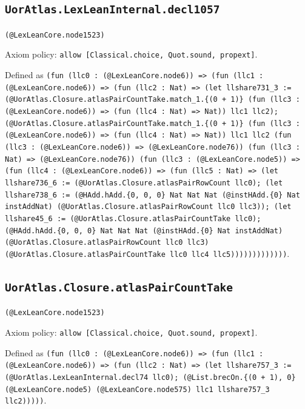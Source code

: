 \documentclass[11pt]{article}
\begin{document}
\subsection*{\texttt{UorAtlas.LexLeanInternal.decl1057}}
\noindent\texttt{(@LexLeanCore.node1523)}\par
\noindent Axiom policy: \texttt{allow [Classical.choice, Quot.sound, propext]}.\par
\noindent Defined as \texttt{(fun (llc0 : (@LexLeanCore.node6)) => (fun (llc1 : (@LexLeanCore.node6)) => (fun (llc2 : Nat) => (let llshare731\_3 := (@UorAtlas.Closure.atlasPairCountTake.match\_1.\{(0 + 1)\} (fun (llc3 : (@LexLeanCore.node6)) => (fun (llc4 : Nat) => Nat)) llc1 llc2); (@UorAtlas.Closure.atlasPairCountTake.match\_1.\{(0 + 1)\} (fun (llc3 : (@LexLeanCore.node6)) => (fun (llc4 : Nat) => Nat)) llc1 llc2 (fun (llc3 : (@LexLeanCore.node6)) => (@LexLeanCore.node76)) (fun (llc3 : Nat) => (@LexLeanCore.node76)) (fun (llc3 : (@LexLeanCore.node5)) => (fun (llc4 : (@LexLeanCore.node6)) => (fun (llc5 : Nat) => (let llshare736\_6 := (@UorAtlas.Closure.atlasPairRowCount llc0); (let llshare738\_6 := (@HAdd.hAdd.\{0, 0, 0\} Nat Nat Nat (@instHAdd.\{0\} Nat instAddNat) (@UorAtlas.Closure.atlasPairRowCount llc0 llc3)); (let llshare45\_6 := (@UorAtlas.Closure.atlasPairCountTake llc0); (@HAdd.hAdd.\{0, 0, 0\} Nat Nat Nat (@instHAdd.\{0\} Nat instAddNat) (@UorAtlas.Closure.atlasPairRowCount llc0 llc3) (@UorAtlas.Closure.atlasPairCountTake llc0 llc4 llc5)))))))))))))}.\par
\subsection*{\texttt{UorAtlas.Closure.atlasPairCountTake}}
\noindent\texttt{(@LexLeanCore.node1523)}\par
\noindent Axiom policy: \texttt{allow [Classical.choice, Quot.sound, propext]}.\par
\noindent Defined as \texttt{(fun (llc0 : (@LexLeanCore.node6)) => (fun (llc1 : (@LexLeanCore.node6)) => (fun (llc2 : Nat) => (let llshare757\_3 := (@UorAtlas.LexLeanInternal.decl74 llc0); (@List.brecOn.\{(0 + 1), 0\} (@LexLeanCore.node5) (@LexLeanCore.node575) llc1 llshare757\_3 llc2)))))}.\par
\end{document}
